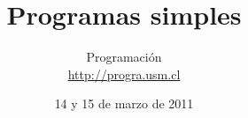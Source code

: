 \documentclass[12pt]{beamer}
\title{Programas simples}
\author{
  Programación \\ \url{http://progra.usm.cl}
}
\date{14 y 15 de marzo de 2011}
\begin{document}
  \begin{frame}
    \maketitle
  \end{frame}
\end{document}
